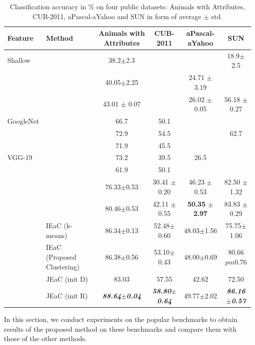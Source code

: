 \documentclass[letterpaper]{article}
\begin{document}
\begin{table}[ht]
\begin{minipage}{\textwidth}
\centering
\caption{Classification accuracy in \% on four public datasets: Animals with Attributes, CUB-2011, aPascal-aYahoo and SUN
in form of average $\pm$ std.
} \vspace{2mm} \label{tab:results}
\begin{tabular}{|l|l|c|c|c|c|}
\hline
Feature & Method & Animals with Attributes & CUB-2011 & aPascal-aYahoo & SUN \\
\hline
{Shallow}
&  \cite{li15max}                 &  38.2$\pm$2.3   &                 &                         & 18.9$\pm$2.5 \\
& \cite{semi15}                    &  40.05$\pm$2.25 &                 &   24.71 $\pm$3.19       &     \\
& \cite{jayaraman14}  &43.01 $\pm$ 0.07 &                 & 26.02 $\pm$ 0.05        & 56.18 $\pm$ 0.27 \\
\hline
{GoogleNet}
& \cite{Akata2015}              & 66.7            & 50.1            &                         & \\
& \cite{Synthesized}       & 72.9            & 54.5            &                         & 62.7 \\
& \cite{Xian2016}                & 71.9            & 45.5            &                         & \\
\hline
{VGG-19}
&  \cite{Kodirov2015}
                                            & 73.2            &  39.5           & 26.5                    &  \\
& \cite{Akata2015}              & 61.9            &  50.1           &                         & \\
&  \cite{sse}            &  76.33$\pm$0.53 & 30.41 $\pm$0.20 &   46.23 $\pm$ 0.53      & 82.50 $\pm$ 1.32    \\
& \cite{agnostic}       &  80.46$\pm$0.53 & 42.11 $\pm$0.55 &   \textbf{50.35 $\pm$ 2.97}      & 83.83 $\pm$ 0.29    \\

& IEaC (k-means)                             & 86.34$\pm$0.13               & 52.48$\pm$0.60              & 48.03$\pm$1.56              & 75.75$\pm$1.06 \\
& IEaC (Proposed Clustering)                             & 86.38$\pm$0.56               & 53.10$\pm$0.43              & 48.00$\pm$0.69              & 80.66$pm$0.76 \\
& JEaC (init D)                     & 83.03                        & 57.55                       & 42.62          & 72.50\\
& JEaC (init R)                     & \textbf{\em 88.64$\pm$0.04}  & \textbf{\em 58.80$\pm$0.64} & 49.77$\pm$2.02 & \textbf{\em 86.16$\pm$0.57} \\
\hline
\end{tabular}
\end{minipage}\vspace{-3mm}
\end{table}
In this section, we conduct experiments on the popular benchmarks to obtain results of the proposed method on these benchmarks and compare them
 with those of the other methods.
\end{document}
